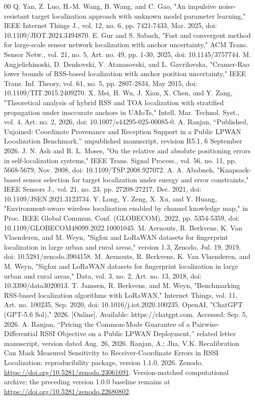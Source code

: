 \documentclass[11pt,a4paper]{article}
\begin{document}
\begin{thebibliography}{00}
 Q. Yan, Z. Luo, H.-M. Wang, B. Wang, and C. Gao, "An impulsive noise-resistant target localization approach with unknown model parameter learning," IEEE Internet Things J., vol. 12, no. 6, pp. 7421-7433, Mar. 2025, doi: 10.1109/JIOT.2024.3494870.
 E. Gur and S. Sabach, "Fast and convergent method for large-scale sensor network localization with anchor uncertainty," ACM Trans. Sensor Netw., vol. 21, no. 5, Art. no. 49, pp. 1-30, 2025, doi: 10.1145/3757744.
 M. Angjelichinoski, D. Denkovski, V. Atanasovski, and L. Gavrilovska, "Cramer-Rao lower bounds of RSS-based localization with anchor position uncertainty," IEEE Trans. Inf. Theory, vol. 61, no. 5, pp. 2807-2834, May 2015, doi: 10.1109/TIT.2015.2409270.
 X. Mei, H. Wu, J. Xian, X. Chen, and Y. Zang, "Theoretical analysis of hybrid RSS and TOA localization with stratified propagation under inaccurate anchors in UAIoTs," Intell. Mar. Technol. Syst., vol. 4, Art. no. 2, 2026, doi: 10.1007/s44295-025-00085-0.
 A. Ranjan, ``Published, Unjoined: Coordinate Provenance and Reception Support in a Public LPWAN Localization Benchmark,'' unpublished manuscript, revision R5.1, 6 September 2026.
 J. N. Ash and R. L. Moses, "On the relative and absolute positioning errors in self-localization systems," IEEE Trans. Signal Process., vol. 56, no. 11, pp. 5668-5679, Nov. 2008, doi: 10.1109/TSP.2008.927072.
 A. A. Ababneh, "Knapsack-based sensor selection for target localization under energy and error constraints," IEEE Sensors J., vol. 21, no. 23, pp. 27208-27217, Dec. 2021, doi: 10.1109/JSEN.2021.3123734.
 Y. Long, Y. Zeng, X. Xu, and Y. Huang, "Environment-aware wireless localization enabled by channel knowledge map," in Proc. IEEE Global Commun. Conf. (GLOBECOM), 2022, pp. 5354-5359, doi: 10.1109/GLOBECOM48099.2022.10001045.
 M. Aernouts, R. Berkvens, K. Van Vlaenderen, and M. Weyn, "Sigfox and LoRaWAN datasets for fingerprint localization in large urban and rural areas," version 1.3, Zenodo, Jul. 19, 2019, doi: 10.5281/zenodo.3904158.
 M. Aernouts, R. Berkvens, K. Van Vlaenderen, and M. Weyn, "Sigfox and LoRaWAN datasets for fingerprint localization in large urban and rural areas," Data, vol. 3, no. 2, Art. no. 13, 2018, doi: 10.3390/data3020013.
 T. Janssen, R. Berkvens, and M. Weyn, "Benchmarking RSS-based localization algorithms with LoRaWAN," Internet Things, vol. 11, Art. no. 100235, Sep. 2020, doi: 10.1016/j.iot.2020.100235.
 OpenAI, "ChatGPT (GPT-5.6 Sol)," 2026. [Online]. Available: https://chatgpt.com. Accessed: Sep. 5, 2026.
 A. Ranjan, ``Pricing the Common-Mode Guarantee of a Pairwise-Differential RSSI Objective on a Public LPWAN Deployment,'' related letter manuscript, version dated Aug. 26, 2026.
 Ranjan, A.; Jha, V.K. Recalibration Can Mask Measured Sensitivity to Receiver-Coordinate Errors in RSSI Localization: reproducibility package, version 1.1.0, 2026. Zenodo. \url{https://doi.org/10.5281/zenodo.23061691}. Version-matched computational archive; the preceding version 1.0.0 baseline remains at \url{https://doi.org/10.5281/zenodo.22680802}.
\end{thebibliography}
\end{document}
